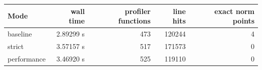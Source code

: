 \documentclass[11pt,a4paper]{scrartcl}
\begin{document}
        \begin{center}
            \begin{tabular}{lrrrr}
                \toprule
                Mode & wall time & profiler functions & line hits & exact norm points\\
                \midrule
                baseline & 2.89299 s & 473 & 120244 & 4\\
                strict & 3.57157 s & 517 & 171573 & 0\\
                performance & 3.46920 s & 525 & 119110 & 0\\
                \bottomrule
            \end{tabular}
        \end{center}

        
\end{document}

